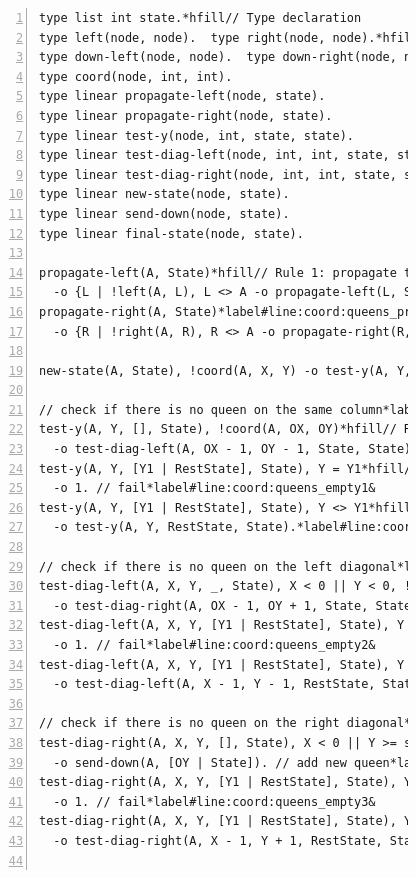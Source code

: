 \begin{figure}[h!]
\begin{Verbatim}[numbers=left,fontsize=\scriptsize,commandchars=\*\#\&]
type list int state.*hfill// Type declaration
type left(node, node).  type right(node, node).*hfill// Predicate declaration
type down-left(node, node).  type down-right(node, node).
type coord(node, int, int).
type linear propagate-left(node, state).
type linear propagate-right(node, state).
type linear test-y(node, int, state, state).
type linear test-diag-left(node, int, int, state, state).
type linear test-diag-right(node, int, int, state, state).
type linear new-state(node, state).
type linear send-down(node, state).
type linear final-state(node, state).

propagate-left(A, State)*hfill// Rule 1: propagate to the left
  -o {L | !left(A, L), L <> A -o propagate-left(L, State)}, new-state(A, State).
propagate-right(A, State)*label#line:coord:queens_propr1&*hfill// Rule 2: propagate to the right
  -o {R | !right(A, R), R <> A -o propagate-right(R, State)}, new-state(A, State).*label#line:coord:queens_propr2&

new-state(A, State), !coord(A, X, Y) -o test-y(A, Y, State, State).*hfill// Rule 3: check if queen can be added

// check if there is no queen on the same column*label#line:coord:queens_col1&
test-y(A, Y, [], State), !coord(A, OX, OY)*hfill// Rule 4: check vertical
  -o test-diag-left(A, OX - 1, OY - 1, State, State).
test-y(A, Y, [Y1 | RestState], State), Y = Y1*hfill// Rule 5: check vertical
  -o 1. // fail*label#line:coord:queens_empty1&
test-y(A, Y, [Y1 | RestState], State), Y <> Y1*hfill// Rule 6: check vertical
  -o test-y(A, Y, RestState, State).*label#line:coord:queens_col2&

// check if there is no queen on the left diagonal*label#line:coord:queens_ldiag1&
test-diag-left(A, X, Y, _, State), X < 0 || Y < 0, !coord(A, OX, OY)*hfill// Rule 7: check left diagonal
  -o test-diag-right(A, OX - 1, OY + 1, State, State).
test-diag-left(A, X, Y, [Y1 | RestState], State), Y = Y1*hfill// Rule 8: check left diagonal
  -o 1. // fail*label#line:coord:queens_empty2&
test-diag-left(A, X, Y, [Y1 | RestState], State), Y <> Y1*hfill// Rule 9: check left diagonal
  -o test-diag-left(A, X - 1, Y - 1, RestState, State).*label#line:coord:queens_ldiag2&

// check if there is no queen on the right diagonal*label#line:coord:queens_rdiag1&
test-diag-right(A, X, Y, [], State), X < 0 || Y >= size, !coord(A, OX, OY)*hfill// Rule 10: check right diagonal
  -o send-down(A, [OY | State]). // add new queen*label#line:coord:queens_add&
test-diag-right(A, X, Y, [Y1 | RestState], State), Y = Y1*hfill// Rule 11: check right diagonal
  -o 1. // fail*label#line:coord:queens_empty3&
test-diag-right(A, X, Y, [Y1 | RestState], State), Y <> Y1*hfill// Rule 12: check right diagonal
  -o test-diag-right(A, X - 1, Y + 1, RestState, State).*label#line:coord:queens_rdiag2&


\end{Verbatim}
\end{figure}

